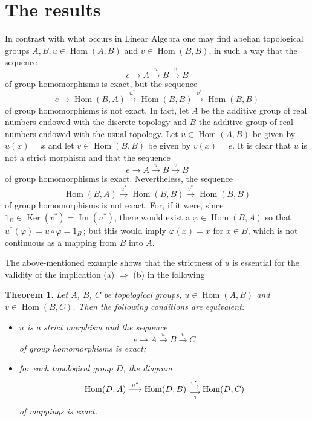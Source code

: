 \documentclass[12pt]{amsart}
\theoremstyle{theorem}
\newtheorem{theorem}{Theorem}[section]
\theoremstyle{definition}
\theoremstyle{remark} \theoremstyle{question} \theoremstyle{example}
\def\vr{{\varphi}}
\def\Hom{\operatorname{{Hom}}}
\def\Ker{\operatorname{{Ker}}}
\def\mI{\operatorname{{Im}}}
\begin{document}


\section{The results}

In contrast with what occurs in Linear Algebra one may find abelian
topological groups $A,B,u \in \Hom(A,B)$ and $v \in \Hom(B,B)$,
in such a way that the sequence
$$
e \longrightarrow A \overset{u}{\longrightarrow} B \overset{v}{\longrightarrow} B
$$
of group homomorphisms is exact, but the sequence
$$
e \longrightarrow \Hom(B,A) \overset{u^*}{\longrightarrow} \Hom(B,B) \overset{v^*}{\longrightarrow} \Hom(B,B)
$$
of group homomorphisms is not exact. In fact, let $A$ be the additive group
of real numbers endowed with the discrete topology and $B$ the additive group
of real numbers endowed with the usual topology. Let $u \in \Hom(A,B)$ be
given by $u(x) = x$ and let $v \in \Hom(B,B)$ be given by $v(x) = e$.
It is clear that $u$ is not a strict morphism and that the sequence
$$
e \longrightarrow A \overset{u}{\longrightarrow} B \overset{v}{\longrightarrow} B
$$
of group homomorphisms is exact. Nevertheless, the sequence
$$
\Hom(B,A) \overset{u^*}{\longrightarrow} \Hom(B,B) \overset{v^*}{\longrightarrow} \Hom(B,B)
$$
of group homomorphisms is not exact. For, if it were, since
$1_B \in \Ker(v^*) = \mI(u^*)$, there would exist a $\vr \in \Hom(B,A)$
so that $u^*(\vr) = u \circ \vr = 1_B$\,; but this would imply $\vr(x) = x$
for $x \in B$, which is not continuous as a mapping from $B$ into $A$.

The above-mentioned example shows that the strictness of $u$ is essential
for the validity of the implication (a) $\Rightarrow$ (b) in the following

\begin{theorem}\label{Theorem3.1}
Let $A$, $B$, $C$ be topological groups, $u \in \Hom(A,B)$ and
$v \in \Hom(B,C)$. Then the following conditions are equivalent:

\begin{itemize}

\item[\rm (a)] $u$ is a strict morphism and the sequence
  $$
  e \longrightarrow A \overset{u}{\longrightarrow} B \overset{v}{\longrightarrow} C
  $$
  of group homomorphisms is exact;

\item[\rm (b)] for each topological group $D$, the diagram
  $$
  \Hom(D,A) \overset{u^*}{\longrightarrow} \Hom(D,B)^{\,\,\overset{v^*}{\longrightarrow}}_{\,\,\,\underset{\bf 1}{\longrightarrow}}\Hom(D,C)
  $$
  of mappings is exact.

\end{itemize}
\end{theorem}
\end{document}
